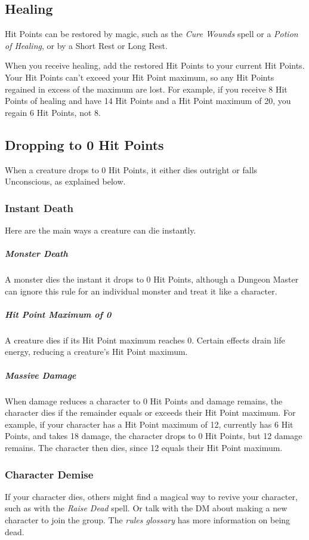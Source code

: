 \documentclass[10pt,a4paper,twoside,bg=print,twocolumn,openany,nodeprecatedcode]{dndbook}
\begin{document}
\subsection{Healing}
Hit Points can be restored by magic, such as the \textit{Cure Wounds} spell or a \textit{Potion of Healing}, or by a Short Rest or Long Rest.

When you receive healing, add the restored Hit Points to your current Hit Points. Your Hit Points can't exceed your Hit Point maximum, so any Hit Points regained in excess of the maximum are lost. For example, if you receive 8 Hit Points of healing and have 14 Hit Points and a Hit Point maximum of 20, you regain 6 Hit Points, not 8.

\subsection{Dropping to 0 Hit Points}
When a creature drops to 0 Hit Points, it either dies outright or falls Unconscious, as explained below.

\subsubsection{Instant Death}
Here are the main ways a creature can die instantly.

\subparagraph{Monster Death}
A monster dies the instant it drops to 0 Hit Points, although a Dungeon Master can ignore this rule for an individual monster and treat it like a character.

\subparagraph{Hit Point Maximum of 0}
A creature dies if its Hit Point maximum reaches 0. Certain effects drain life energy, reducing a creature's Hit Point maximum.

\subparagraph{Massive Damage}
When damage reduces a character to 0 Hit Points and damage remains, the character dies if the remainder equals or exceeds their Hit Point maximum. For example, if your character has a Hit Point maximum of 12, currently has 6 Hit Points, and takes 18 damage, the character drops to 0 Hit Points, but 12 damage remains. The character then dies, since 12 equals their Hit Point maximum.

\subsubsection{Character Demise}
If your character dies, others might find a magical way to revive your character, such as with the \textit{Raise Dead} spell. Or talk with the DM about making a new character to join the group. The \textit{rules glossary} has more information on being dead.
\end{document}

